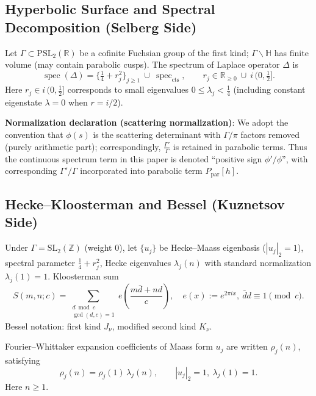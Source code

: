 \documentclass[11pt,a4paper]{article}
\theoremstyle{remark}
\DeclareMathOperator{\spec}{spec}
\begin{document}
\subsection{Hyperbolic Surface and Spectral Decomposition (Selberg Side)}

Let $\Gamma\subset \mathrm{PSL}_2(\mathbb{R})$ be a cofinite Fuchsian group of the first kind; $\Gamma\backslash\mathbb{H}$ has finite volume (may contain parabolic cusps). The spectrum of Laplace operator $\Delta$ is
\begin{equation}
\spec(\Delta)=\bigl\{\tfrac{1}{4}+r_j^2\bigr\}_{j\ge1}\ \cup\ \spec_{\mathrm{cts}},\qquad
r_j\in \mathbb{R}_{\ge0}\ \cup\ i\,(0,\tfrac{1}{2}] .
\end{equation}
Here $r_j\in i\,(0,\tfrac{1}{2}]$ corresponds to small eigenvalues $0\le \lambda_j<\tfrac{1}{4}$ (including constant eigenstate $\lambda=0$ when $r=i/2$).

\textbf{Normalization declaration (scattering normalization)}: We adopt the convention that $\phi(s)$ is the scattering determinant with $\Gamma/\pi$ factors removed (purely arithmetic part); correspondingly, $\tfrac{\Gamma'}{\Gamma}$ is retained in parabolic terms. Thus the continuous spectrum term in this paper is denoted ``positive sign $\phi'/\phi$'', with corresponding $\Gamma'/\Gamma$ incorporated into parabolic term $P_{\mathrm{par}}[h]$.

\subsection{Hecke--Kloosterman and Bessel (Kuznetsov Side)}

Under $\Gamma=\mathrm{SL}_2(\mathbb{Z})$ (weight $0$), let $\{u_j\}$ be Hecke--Maass eigenbasis ($|u_j|_2=1$), spectral parameter $\tfrac{1}{4}+r_j^2$, Hecke eigenvalues $\lambda_j(n)$ with standard normalization $\lambda_j(1)=1$. Kloosterman sum
\begin{equation}
S(m,n;c)=\sum_{\substack{d\bmod c\\ \gcd(d,c)=1}}
e\left(\frac{m\bar{d}+nd}{c}\right),
\quad e(x):=e^{2\pi i x},\ \bar{d} d\equiv 1\pmod c .
\end{equation}
Bessel notation: first kind $J_\nu$, modified second kind $K_\nu$.

Fourier--Whittaker expansion coefficients of Maass form $u_j$ are written $\rho_j(n)$, satisfying
\begin{equation}
\rho_j(n)=\rho_j(1)\,\lambda_j(n),\qquad |u_j|_2=1,\ \lambda_j(1)=1.
\end{equation}
Here $n\ge1$.
\end{document}
